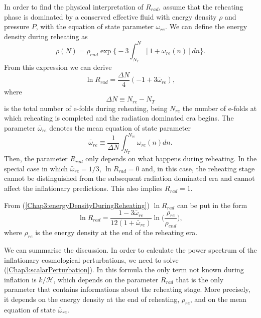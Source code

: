 \documentclass[11pt,a4paper,twoside]{book}
\begin{document}
In order to find the physical interpretation of $ R_{rad} $, assume that the reheating phase is dominated by a conserved effective fluid with energy density $\rho$ and pressure $ P $, with the equation of state parameter $\omega_{re}$.  We can define the energy density during reheating as
\begin{equation}
	\label{Chap3:energyDensityDuringReheating}
	\rho(N) = \rho_{end} \exp \Biggl\{-3 \int_{N_{T}}^{N}[1+\omega_{re}(n)]dn\Biggr\}.
\end{equation}
From this expression we can derive
\begin{equation}
\label{Chap3:lnRad}
\ln R_{rad} = \frac{\Delta N}{4}(-1 + 3\bar{\omega}_{re}),
\end{equation}
where 
\begin{equation}
	\Delta N \equiv N_{re} - N_{T}
\end{equation}
is the total number of e-folds during reheating, being $ N_{re} $ the number of e-folds at which reheating is completed and the radiation dominated era begins. The parameter $\bar{\omega}_{re}$ denotes the mean equation of state parameter
\begin{equation}
\label{Chap3:meanEqStateParametere}
\bar{\omega}_{re}\equiv \frac{1}{\Delta N}\int_{N_{T}}^{N_{re}}\omega_{re}(n)dn.
\end{equation}
Then, the parameter $ R_{rad} $  only depends on what happens during reheating. In the special case  in which $ \bar{\omega}_{re}=1/3 $, $ \ln R_{rad}=0 $ and, in this case, the reheating stage cannot be distinguished from the subsequent radiation dominated era and cannot affect the inflationary predictions. This also implies $ R_{rad}=1 $.

From (\ref{Chap3:energyDensityDuringReheating}) $ \ln R_{rad} $ can be put in the form
\begin{equation}
\label{Chap3:Rrad2}
\ln R_{rad}= \frac{1-3\bar{\omega}_{re}}{12(1+\bar{\omega}_{re})}\ln \Bigg ( \frac{\rho_{re}}{\rho_{end}} \Bigg),
\end{equation}
where $ \rho_{re} $ is the energy density at the end of the reheating era. 

 We can summarise the discussion. In order to calculate the power spectrum of the inflationary cosmological perturbations, we need to solve (\ref{Chap3:scalarPerturbation}). In this formula the only term not known during inflation is $ k/\mathcal{H} $, which depends on the parameter $ R_{rad} $ that is the only parameter that contains informations about the reheating stage. More precisely, it depends on the energy density at the end of reheating, $\rho_{re}$, and on the mean equation of state $\bar{\omega}_{re}$.
 
\end{document}
